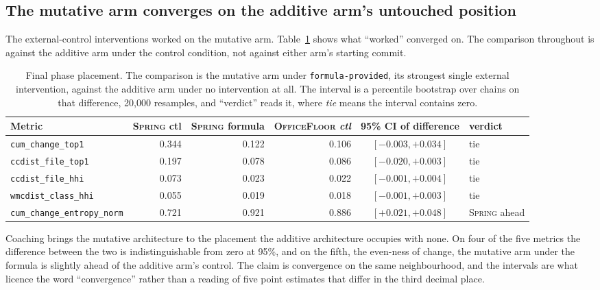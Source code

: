 \documentclass[11pt,a4paper]{article}
\newcommand{\sprg}{\textsc{Spring}}
\newcommand{\offl}{\textsc{OfficeFloor}}
\begin{document}
\subsection{The mutative arm converges on the additive arm's untouched position}
\label{sec:converge}

The external-control interventions worked on the mutative arm.
Table~\ref{tab:convergence} shows what ``worked'' converged on. The comparison
throughout is against the additive arm under the control condition, not against
either arm's starting commit.

\begin{table}[t]
\centering
\caption{Final phase placement. The comparison is the mutative arm under
\texttt{formula-provided}, its strongest single external intervention, against
the additive arm under no intervention at all. The interval is a percentile
bootstrap over chains on that difference, 20{,}000 resamples, and ``verdict''
reads it, where \emph{tie} means the interval contains zero.}
\label{tab:convergence}
\scriptsize
\setlength{\tabcolsep}{5pt}
\begin{tabular}{lrrrcl}
\toprule
Metric & \sprg{} ctl & \sprg{} formula & \offl{} \emph{ctl} & 95\% CI of difference & verdict \\
\midrule
\texttt{cum\_change\_top1}          & 0.344 & 0.122 & 0.106 & $[-0.003, +0.034]$ & tie \\
\texttt{ccdist\_file\_top1}         & 0.197 & 0.078 & 0.086 & $[-0.020, +0.003]$ & tie \\
\texttt{ccdist\_file\_hhi}          & 0.073 & 0.023 & 0.022 & $[-0.001, +0.004]$ & tie \\
\texttt{wmcdist\_class\_hhi}        & 0.055 & 0.019 & 0.018 & $[-0.001, +0.003]$ & tie \\
\texttt{cum\_change\_entropy\_norm} & 0.721 & 0.921 & 0.886 & $[+0.021, +0.048]$ & \sprg{} ahead \\
\bottomrule
\end{tabular}
\end{table}

Coaching brings the mutative architecture to the placement the additive
architecture occupies with none. On four of the five metrics the difference
between the two is indistinguishable from zero at 95\%, and on the fifth, the
even-ness of change, the mutative arm under the formula is slightly ahead of the
additive arm's control. The claim is convergence on the same neighbourhood, and
the intervals are what licence the word ``convergence'' rather than a reading of
five point estimates that differ in the third decimal place.
\end{document}
